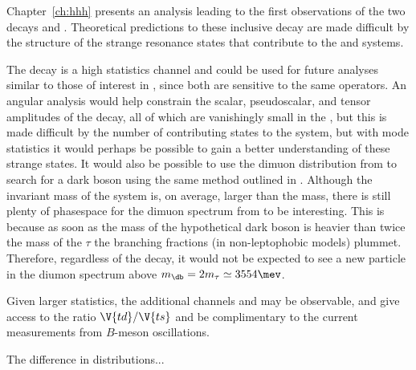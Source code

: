 
Chapter~\ref{ch:hhh} presents an analysis leading to the first observations of the two decays
\btokpipimumu and \btophikmumu.
Theoretical predictions to these inclusive decay are made difficult by the structure of the strange
resonance states that contribute to the \kpipi and \phik systems.

The decay \btokpipimumu is a high statistics channel and could be used for future analyses similar to
those of interest in \btokstrmumu, since both are sensitive to the same operators.
An angular analysis would help constrain the scalar, pseudoscalar, and tensor amplitudes of the
decay, all of which are vanishingly small in the \sm, but this is made difficult by the number of
contributing states to the \kpipi system,
but with mode statistics it would perhaps be possible to gain a better understanding of these
strange states.
It would also be possible to use the dimuon distribution from \btokpipimumu to search for a dark
boson using the same method outlined in .
Although the invariant mass of the \kpipi system is, on average, larger than the \Kstarz mass,
there is still plenty of phasespace for the dimuon spectrum from \btokpipimumu to be interesting.
This is because as soon as the mass of the hypothetical dark boson is heavier than twice the mass
of the $\tau$ the branching fractions (in non-leptophobic models) plummet.
Therefore, regardless of the decay, it would not be expected to see a new particle in the diumon
spectrum above $m_\db=2m_\tau\simeq3554\mev$.

Given larger statistics, the additional channels \decay{\Bp}{\Kp\Km\pip} and \decay{\Bp}{\pip\pipi}
may be observable, and give access to the ratio $\V{td}/\V{ts}$ and be complimentary to the current
measurements from $B$-meson oscillations.

The difference in \kpipi distributions...





